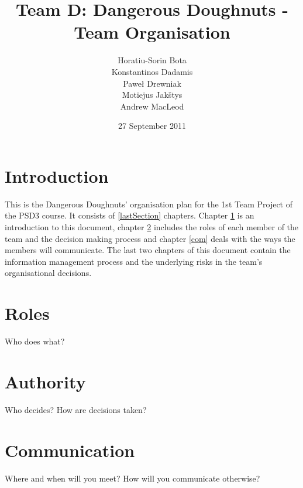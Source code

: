 \documentclass{article}
\begin{document}
\title{Team D: Dangerous Doughnuts - Team Organisation}
\author{Horatiu-Sorin Bota \\
		Konstantinos Dadamis \\
		Paweł Drewniak \\
		Motiejus Jakštys \\
		Andrew MacLeod}

\date{27 September 2011}
\maketitle

\section{Introduction}
\label{intro}

This is the Dangerous Doughnuts' organisation plan for the 1st Team
Project of the PSD3 course. It consists of \ref{lastSection}
chapters. Chapter \ref{intro} is an introduction to this document,
chapter \ref{role_auth} includes the roles of each member of the team
and the decision making process and chapter \ref{com} deals with the ways the members
will communicate. The last two chapters of this document contain the
information management process and the underlying risks in the
team's organisational decisions.

\section{Roles}
\label{role_auth}

Who does what?


\section{Authority}

Who decides?  How are decisions taken?


\section{Communication}

Where and when will you meet?  How will you communicate otherwise?

\end{document}

